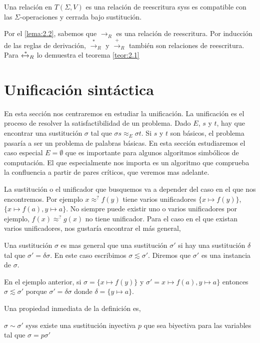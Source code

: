 \begin{defi}
  Una relación en $T(\Sigma, V)$ es una relación de reescritura syss
  es compatible con las $\Sigma$-operaciones y cerrada bajo
  sustitución.
\end{defi}

Por el \ref{lema:2.2}, sabemos que $\rightarrow_R$ es una relación de
reescritura. Por inducción de las reglas de derivación,
$\xrightarrow{*}_R$ y $\xrightarrow{+}_R$ también son relaciones de
reescritura. Para $\xleftrightarrow{*}_R$ lo demuestra el teorema \ref{teor:2.1}

\section{Unificación sintáctica}

En esta sección nos centraremos en estudiar la unificación. La
unificación es el proceso de resolver la satisfactibilidad de un
problema. Dado $E$, $s$ y $t$, hay que encontrar una sustitución
$\sigma$ tal que $\sigma s \approx _E \sigma t$. Si $s$ y $t$ son
básicos, el problema pasaría a ser un problema de palabras básicas. En
esta sección estudiaremos el caso especial $E = \emptyset$ que es
importante para algunos algoritmos simbólicos de computación. El que
especialmente nos importa es un algoritmo que comprueba la confluencia
a partir de pares críticos, que veremos mas adelante.

La sustitución o el unificador que busquemos va a
depender del caso en el que nos encontremos. Por ejemplo $x \approx^?
f(y)$ tiene varios unificadores $\{x \mapsto f(y) \}$, $\{x \mapsto
f(a), y \mapsto a\}$. No siempre puede existir uno o varios
unificadores por ejemplo, $f(x) \approx^? g(x)$ no tiene
unificador. Para el caso en el que existan varios unificadores, nos
gustaría encontrar el más general,

\begin{defi}
  Una sustitución $\sigma$ es mas general que una sustitución
  $\sigma'$ si hay una sustitución $\delta$ tal que $ \sigma' = \delta
  \sigma$. En este caso escribimos $\sigma \lesssim \sigma'$. Diremos
  que $\sigma'$ es una instancia de $\sigma$.
\end{defi}

En el ejemplo anterior, si $\sigma = \{x \mapsto f(y) \}$ y
$\sigma' = x \mapsto f(a), y \mapsto a\}$ entonces
$\sigma \lesssim \sigma'$ porque $\sigma' = \delta \sigma$ donde
$\delta = \{ y \mapsto a \}$.

Una propiedad inmediata de la definición es,
\begin{lema} \label{lema:3.1}
  $\sigma \sim \sigma '$ syss existe una sustitución inyectiva $p$ que
  sea biyectiva para las variables tal que $\sigma = p \sigma '$
\end{lema}

